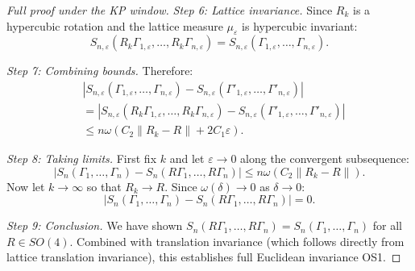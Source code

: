 \documentclass[11pt]{amsart}
\begin{document}
\begin{proof}[Full proof under the KP window]
\emph{Step 6: Lattice invariance.} Since $R_k$ is a hypercubic rotation and the lattice measure $\mu_{\varepsilon}$ is hypercubic invariant:
\[
  S_{n,\varepsilon}(R_k \Gamma_{1,\varepsilon}, \ldots, R_k \Gamma_{n,\varepsilon}) = S_{n,\varepsilon}(\Gamma_{1,\varepsilon}, \ldots, \Gamma_{n,\varepsilon}).
\]

\emph{Step 7: Combining bounds.} Therefore:
\begin{align}
  &|S_{n,\varepsilon}(\Gamma_{1,\varepsilon}, \ldots, \Gamma_{n,\varepsilon}) - S_{n,\varepsilon}(\Gamma'_{1,\varepsilon}, \ldots, \Gamma'_{n,\varepsilon})| \\
  &= |S_{n,\varepsilon}(R_k \Gamma_{1,\varepsilon}, \ldots, R_k \Gamma_{n,\varepsilon}) - S_{n,\varepsilon}(\Gamma'_{1,\varepsilon}, \ldots, \Gamma'_{n,\varepsilon})| \\
  &\le n \omega(C_2 \|R_k - R\| + 2C_1 \varepsilon).
\end{align}

\emph{Step 8: Taking limits.} First fix $k$ and let $\varepsilon \to 0$ along the convergent subsequence:
\[
  |S_n(\Gamma_1, \ldots, \Gamma_n) - S_n(R\Gamma_1, \ldots, R\Gamma_n)| \le n \omega(C_2 \|R_k - R\|).
\]
Now let $k \to \infty$ so that $R_k \to R$. Since $\omega(\delta) \to 0$ as $\delta \to 0$:
\[
  |S_n(\Gamma_1, \ldots, \Gamma_n) - S_n(R\Gamma_1, \ldots, R\Gamma_n)| = 0.
\]

\emph{Step 9: Conclusion.} We have shown $S_n(R\Gamma_1, \ldots, R\Gamma_n) = S_n(\Gamma_1, \ldots, \Gamma_n)$ for all $R \in SO(4)$. Combined with translation invariance (which follows directly from lattice translation invariance), this establishes full Euclidean invariance OS1.
\end{proof}
\end{document}
